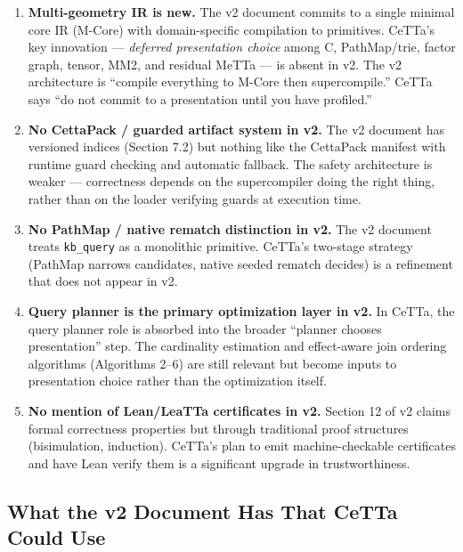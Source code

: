 \documentclass[11pt]{article}
\begin{document}
\begin{enumerate}
    \item \textbf{Multi-geometry IR is new.} The v2 document commits to a single minimal core IR (M-Core) with domain-specific compilation to primitives. CeTTa's key innovation --- \textit{deferred presentation choice} among C, PathMap/trie, factor graph, tensor, MM2, and residual MeTTa --- is absent in v2. The v2 architecture is ``compile everything to M-Core then supercompile.'' CeTTa says ``do not commit to a presentation until you have profiled.''

    \item \textbf{No CettaPack / guarded artifact system in v2.} The v2 document has versioned indices (Section 7.2) but nothing like the CettaPack manifest with runtime guard checking and automatic fallback. The safety architecture is weaker --- correctness depends on the supercompiler doing the right thing, rather than on the loader verifying guards at execution time.

    \item \textbf{No PathMap / native rematch distinction in v2.} The v2 document treats \texttt{kb\_query} as a monolithic primitive. CeTTa's two-stage strategy (PathMap narrows candidates, native seeded rematch decides) is a refinement that does not appear in v2.

    \item \textbf{Query planner is the primary optimization layer in v2.} In CeTTa, the query planner role is absorbed into the broader ``planner chooses presentation'' step. The cardinality estimation and effect-aware join ordering algorithms (Algorithms 2--6) are still relevant but become inputs to presentation choice rather than the optimization itself.

    \item \textbf{No mention of Lean/LeaTTa certificates in v2.} Section 12 of v2 claims formal correctness properties but through traditional proof structures (bisimulation, induction). CeTTa's plan to emit machine-checkable certificates and have Lean verify them is a significant upgrade in trustworthiness.
\end{enumerate}

\subsection{What the v2 Document Has That CeTTa Could Use}
\end{document}
